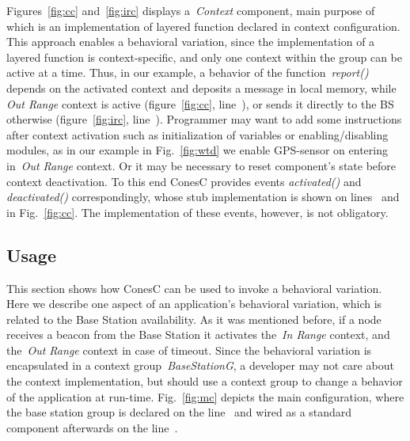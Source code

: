 
Figures~\ref{fig:cc} and~\ref{fig:irc} displays a~\emph{Context} component, main
purpose of which is an implementation of layered function declared in context configuration. 
This approach enables a behavioral variation, since the implementation of a layered function is
context-specific, and only one context within the group can be active at a time. Thus, in our
example, a behavior of the function~\emph{report()} depends on the activated context and
deposits a message in local memory, while \emph{Out Range} context
is active (figure~\ref{fig:cc}, line~),
or sends it directly to the BS otherwise (figure~\ref{fig:irc}, line~).
Programmer may want to add some instructions after
context activation such as initialization of variables or enabling/disabling
modules, as in our example in Fig.~\ref{fig:wtd} we enable GPS-sensor on entering
in~\emph{Out Range} context. Or it may be necessary to reset component's state before context
deactivation. To this end ConesC provides events \emph{activated()} and
\emph{deactivated()} correspondingly, whose stub implementation is shown on
lines~ and~ in Fig.~\ref{fig:cc}. The implementation of
these events, however, is not obligatory.


\subsection{Usage}

This section shows how ConesC can be used to invoke a behavioral
variation. Here we describe one aspect of an application's behavioral variation,
which is related to the Base Station availability. As it was mentioned before,
if a node receives a beacon from the Base Station it activates the~\emph{In Range}
context, and the~\emph{Out Range} context in case of timeout.
Since the behavioral variation is encapsulated in a context group~\emph{BaseStationG},
a developer may not care about the context implementation, but should use a context group
to change a behavior of the application at run-time. Fig.~\ref{fig:mc} depicts the main
configuration, where the base station group is declared on the line~ and wired
as a standard component afterwards on the line~.

